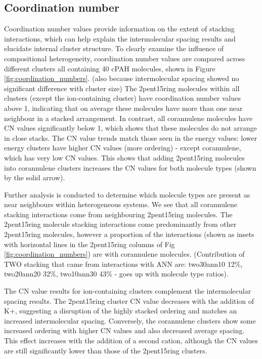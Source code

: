 \subsection{Coordination number}

Coordination number values provide information on the extent of stacking interactions, which can help explain the intermolecular spacing results and elucidate internal cluster structure. To clearly examine the influence of compositional heterogeneity, coordination number values are compared across different clusters all containing 40 cPAH molecules, shown in Figure \ref{fig:coordination_numbers}. (also because intermolecular spacing showed no significant difference with cluster size) %
The 2pent15ring molecules within all clusters (except the ion-containing cluster) have coordination number values above 1, indicating that on average these molecules have more than one near neighbour in a stacked arrangement. In contrast, all corannulene molecules have CN values significantly below 1, which shows that these molecules do not arrange in close stacks.  The CN value trends match those seen in the energy values: lower energy clusters have higher CN values (more ordering) - except corannulene, which has very low CN values. %
This shows that adding 2pent15ring molecules into corannulene clusters increases the CN values for both molecule types (shown by the solid arrow).

Further analysis is conducted to determine which molecule types are present as near neighbours within heterogeneous systems.  We see that all corannulene stacking interactions come from neighbouring 2pent15ring molecules.  The 2pent15ring molecule stacking interactions come predominantly from other 2pent15ring molecules, however a proportion of the interactions (shown as insets with horizontal lines in the 2pent15ring columns of Fig \ref{fig:coordination_numbers}) are with corannulene molecules.  (Contribution of TWO stacking that came from interactions with ANN are: two30ann10 12\%, two20ann20 32\%, two10ann30 43\% - goes up with molecule type ratios).

The CN value results for ion-containing clusters complement the intermolecular spacing results. The 2pent15ring cluster CN value decreases with the addition of K+, suggesting a disruption of the highly stacked ordering and matches an increased intermolecular spacing. Conversely, the corannulene clusters show some increased ordering with higher CN values and also decreased average spacing. This effect increases with the addition of a second cation, although the CN values are still significantly lower than those of the 2pent15ring clusters.

